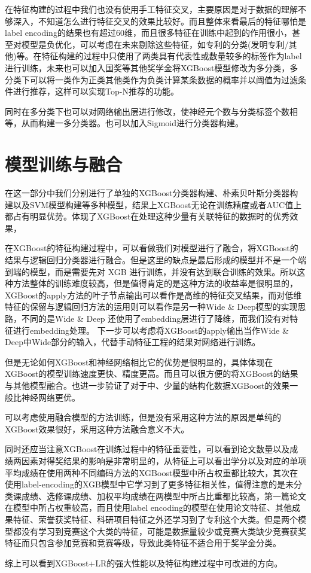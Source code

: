 在特征构建的过程中我们也没有使用手工特征交叉，主要原因是对于数据的理解不够深入，不知道怎么进行特征交叉的效果比较好。而且整体来看最后的特征哪怕是label encoding的结果也有超过60维，而且很多特征在训练中起到的作用很小，甚至对模型是负优化，可以考虑在未来剔除这些特征，如专利的分类(发明专利/其他)等。在特征构建的过程中只使用了两类具有代表性或数量较多的标签作为label进行训练，未来也可以加入国奖等其他奖学金将XGBoost模型修改为多分类，多分类下可以将一类作为正类其他类作为负类计算某条数据的概率并以阈值为过滤条件进行推荐，这样可以实现Top-N推荐的功能。

同时在多分类下也可以对网络输出层进行修改，使神经元个数与分类标签个数相等，从而构建一多分类器。也可以加入Sigmoid进行分类器构建。

\section{模型训练与融合}

在这一部分中我们分别进行了单独的XGBoost分类器构建、朴素贝叶斯分类器构建以及SVM模型构建等多种模型，结果上XGBoost无论在训练精度或者AUC值上都占有明显优势。体现了XGBoost在处理这种少量有关联特征的数据时的优秀效果，

在XGBoost的特征构建过程中，可以看做我们对模型进行了融合，将XGBoost的结果与逻辑回归分类器进行融合。但是这里的缺点是最后形成的模型并不是一个端到端的模型，而是需要先对 XGB 进行训练，并没有达到联合训练的效果。所以这种方法整体的训练难度较高，但是值得肯定的是这种方法的收益率是很明显的，XGBoost的apply方法的叶子节点输出可以看作是高维的特征交叉结果，而对低维特征的保留与逻辑回归方法的运用则可以看作是另一种Wide \& Deep模型的实现思路，不同的是Wide \& Deep 还使用了embedding层进行了降维，而我们没有对特征进行embedding处理。
下一步可以考虑将XGBoost的apply输出当作Wide \& Deep中Wide部分的输入，代替手动特征工程的结果对网络进行训练。

但是无论如何XGBoost和神经网络相比它的优势是很明显的，具体体现在XGBoost的模型训练速度更快、精度更高。而且可以很方便的将XGBoost的结果与其他模型融合。也进一步验证了对于中、少量的结构化数据XGBoost的效果一般比神经网络更优。

可以考虑使用融合模型的方法训练，但是没有采用这种方法的原因是单纯的XGBoost效果很好，采用这种方法融合意义不大。

同时还应当注意XGBoost在训练过程中的特征重要性，可以看到论文数量以及成绩两因素对得奖结果的影响是非常明显的，从特征上可以看出学分以及对应的单项平均成绩在使用两种不同编码方法的XGBoost模型中所占权重都比较大，其次在使用label-encoding的XGB模型中它学习到了更多特征相关性，值得注意的是未分类课成绩、选修课成绩、加权平均成绩在两模型中所占比重都比较高，第一篇论文在模型中所占权重较高，而且使用label encoding的模型在使用论文特征、其他成果特征、荣誉获奖特征、科研项目特征之外还学习到了专利这个大类。但是两个模型都没有学习到竞赛这个大类的特征，可能是数据量较少或竞赛大类缺少竞赛获奖特征而只包含参加竞赛和竞赛等级，导致此类特征不适合用于奖学金分类。

综上可以看到XGBoost+LR的强大性能以及特征构建过程中可改进的方向。
